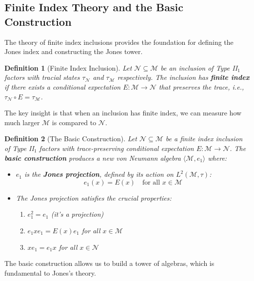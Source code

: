 \documentclass[11pt, a4paper]{article}
\theoremstyle{colored_def}
\newtheorem{definition}{Definition}[section]
\theoremstyle{colored_thm}
\theoremstyle{colored_ex}
\newcommand{\M}{\mathcal{M}}
\newcommand{\N}{\mathcal{N}}
\begin{document}
\subsection{Finite Index Theory and the Basic Construction}

The theory of finite index inclusions provides the foundation for defining the Jones index and constructing the Jones tower.

\begin{definition}[Finite Index Inclusion]
Let $\N \subseteq \M$ be an inclusion of Type II$_1$ factors with tracial states $\tau_\N$ and $\tau_\M$ respectively. The inclusion has \textbf{finite index} if there exists a conditional expectation $E: \M \to \N$ that preserves the trace, i.e., $\tau_\N \circ E = \tau_\M$.
\end{definition}

The key insight is that when an inclusion has finite index, we can measure how much larger $\M$ is compared to $\N$.

\begin{definition}[The Basic Construction]\label{def:basic-construction}
Let $\N \subseteq \M$ be a finite index inclusion of Type II$_1$ factors with trace-preserving conditional expectation $E: \M \to \N$. The \textbf{basic construction} produces a new von Neumann algebra $\langle \M, e_1 \rangle$ where:

\begin{itemize}
    \item $e_1$ is the \textbf{Jones projection}, defined by its action on $L^2(\M, \tau)$:
    $$ e_1(x) = E(x) \quad \text{for all } x \in \M $$
    \item The Jones projection satisfies the crucial properties:
    \begin{enumerate}
        \item $e_1^2 = e_1$ (it's a projection)
        \item $e_1 x e_1 = E(x) e_1$ for all $x \in \M$
        \item $x e_1 = e_1 x$ for all $x \in \N$
    \end{enumerate}
\end{itemize}
\end{definition}

The basic construction allows us to build a tower of algebras, which is fundamental to Jones's theory.
\end{document}

